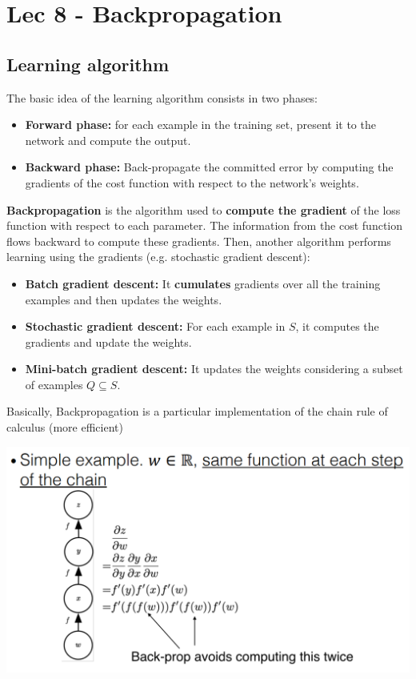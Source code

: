 \chapter{Lec 8 - Backpropagation}

\section{Learning algorithm}
The basic idea of the learning algorithm consists in two phases:
\begin{itemize}
    \item \textbf{Forward phase:} for each example in the training set, present it to the network and compute the output.
    \item \textbf{Backward phase:} Back-propagate the committed error by computing the gradients of the cost function with respect to the network's weights. 
\end{itemize}
\textbf{Backpropagation} is the algorithm used to \textbf{compute the gradient} of the loss function with respect to each parameter. The information from the cost function flows backward to compute these gradients. Then, another algorithm performs learning using the gradients (e.g. stochastic gradient descent):
\begin{itemize}
    \item \textbf{Batch gradient descent:} It \textbf{cumulates} gradients over all the training examples and then updates the weights.
    \item \textbf{Stochastic gradient descent:} For each example in $S$, it computes the gradients and update the weights.
    \item \textbf{Mini-batch gradient descent:} It updates the weights considering a subset of examples $Q \subseteq S$. 
\end{itemize}
Basically, Backpropagation is a particular implementation of the chain rule of calculus (more efficient)
\begin{center}
    \includegraphics[scale=0.5]{images/Backprop.png}
\end{center}

